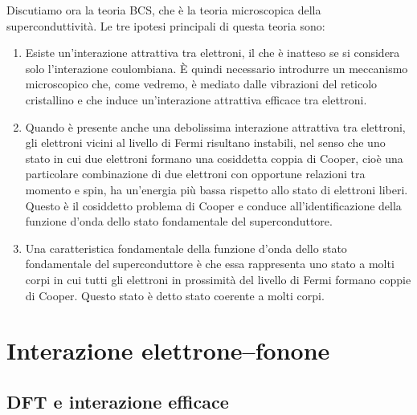 Discutiamo ora la teoria BCS, che è la teoria microscopica della superconduttività. Le tre ipotesi principali di questa teoria sono:
\begin{enumerate}[leftmargin=0.6cm]
   \item Esiste un'interazione attrattiva tra elettroni, il che è inatteso se si considera solo l'interazione coulombiana. È quindi necessario introdurre un meccanismo microscopico che, come vedremo, è mediato dalle vibrazioni del reticolo cristallino e che induce un'interazione attrattiva efficace tra elettroni.
   \item Quando è presente anche una debolissima interazione attrattiva tra elettroni, gli elettroni vicini al livello di Fermi risultano instabili, nel senso che uno stato in cui due elettroni formano una cosiddetta coppia di Cooper, cioè una particolare combinazione di due elettroni con opportune relazioni tra momento e spin, ha un'energia più bassa rispetto allo stato di elettroni liberi. Questo è il cosiddetto problema di Cooper e conduce all'identificazione della funzione d'onda dello stato fondamentale del superconduttore.
   \item Una caratteristica fondamentale della funzione d'onda dello stato fondamentale del superconduttore è che essa rappresenta uno stato a molti corpi in cui tutti gli elettroni in prossimità del livello di Fermi formano coppie di Cooper. Questo stato è detto stato coerente a molti corpi.
\end{enumerate}
\section{Interazione elettrone--fonone}
\subsection{DFT e interazione efficace}

